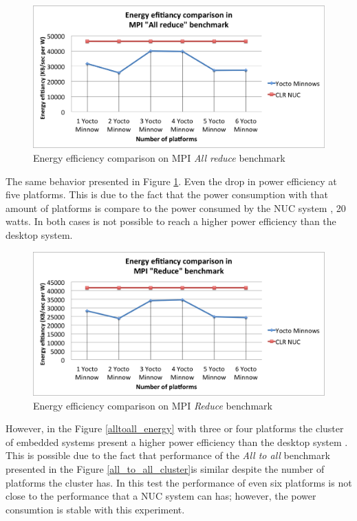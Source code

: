 \begin{figure}[H]
\centering
\includegraphics[width=1 \textwidth]{images/energy_results/allreduce.png}
\caption{Energy efficiency comparison on MPI \textit{All reduce} benchmark}
\label{all_reduce_energy}
\end{figure}

The same behavior presented in Figure \ref{all_reduce_energy}. Even the drop in
power efficiency at five platforms. This is due to the fact that the power
consumption with that amount of platforms is compare to the power consumed by
the NUC system \cite{NUC}, 20 watts.  In both cases is not possible to reach a
higher power efficiency than the desktop system. 

\begin{figure}[H]
\centering
\includegraphics[width=1 \textwidth]{images/energy_results/reduce.png}
\caption{Energy efficiency comparison on MPI \textit{Reduce} benchmark}
\label{reduce_energy}
\end{figure}

However, in the Figure \ref{alltoall_energy} with three or four platforms the
cluster of embedded systems present a higher power efficiency than the desktop
system \cite{NUC}. This is possible due to the fact that performance of the
\textit{All to all} benchmark presented in the Figure
\ref{all_to_all_cluster}is similar despite the number of platforms the cluster
has. In this test the performance of even six platforms is not close to the
performance that a NUC \cite{NUC} system can has; however, the power consumtion
is stable with this experiment.

